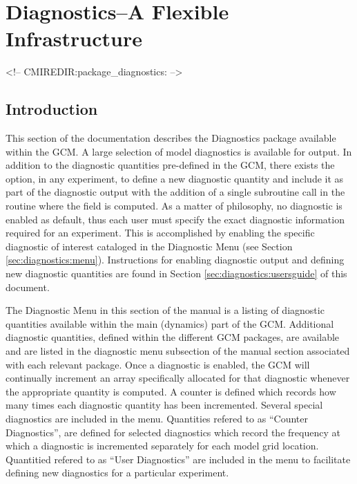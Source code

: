 \section{Diagnostics--A Flexible Infrastructure}
\label{sec:pkg:diagnostics}
\begin{rawhtml}
<!-- CMIREDIR:package_diagnostics: -->
\end{rawhtml}

\subsection{Introduction}

\noindent
This section of the documentation describes the Diagnostics package available within 
the GCM.  A large selection of model diagnostics is available for output.  
In addition to the diagnostic quantities pre-defined in the GCM, there exists
the option, in any experiment, to define a new diagnostic quantity and include it
as part of the diagnostic output with the addition of a single subroutine call in the
routine where the field is computed. As a matter of philosophy, no diagnostic is enabled 
as default, thus each user must specify the exact diagnostic information required for an 
experiment.  This is accomplished by enabling the specific diagnostic of interest cataloged 
in the Diagnostic Menu (see Section \ref{sec:diagnostics:menu}). Instructions for enabling
diagnostic output and defining new diagnostic quantities are found in Section 
\ref{sec:diagnostics:usersguide} of this document.

\noindent
The Diagnostic Menu in this section of the manual is a listing of diagnostic quantities available 
within the main (dynamics) part of the GCM. Additional diagnostic quantities, defined within the
different GCM packages, are available and are listed in the diagnostic menu subsection of 
the manual section associated with each relevant package. Once a diagnostic is enabled, the 
GCM will continually increment an array specifically allocated for that diagnostic whenever the 
appropriate quantity is computed.  A counter is defined which records how many times each diagnostic 
quantity has been incremented.  Several special diagnostics are included in the menu. Quantities 
refered to as ``Counter Diagnostics'', are defined for selected diagnostics which record the 
frequency at which a diagnostic is incremented separately for each model grid location.
Quantitied refered to as ``User Diagnostics'' are included in the menu to facilitate
defining new diagnostics for a particular experiment.

